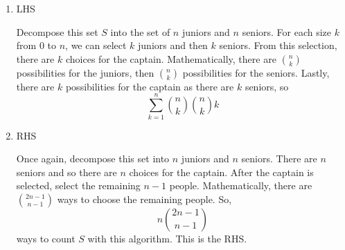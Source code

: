 \documentclass[12pt]{exam}
\begin{document}
\begin{enumerate}
\begin{enumerate}
    \item LHS
    
    Decompose this set $S$ into the set of $n$ juniors and $n$ seniors. For each size $k$ from $0$ to $n$, we can select $k$ juniors and then $k$ seniors. From this selection, there are $k$ choices for the captain. Mathematically, there are $\binom{n}{k}$ possibilities for the juniors, then $\binom{n}{k}$ possibilities for the seniors. Lastly, there are $k$ possibilities for the captain as there are $k$ seniors, so $$\sum_{k = 1}^{n} \binom{n}{k} \binom{n}{k} k$$
    
    \item RHS
    
    Once again, decompose this set into $n$ juniors and $n$ seniors. There are $n$ seniors and so there are $n$ choices for the captain. After the captain is selected, select the remaining $n - 1$ people. Mathematically, there are $\binom{2n - 1}{n - 1}$ ways to choose the remaining people. So, $$n \binom{2n - 1}{n - 1}$$ ways to count $S$ with this algorithm. This is the RHS. 
    
\end{enumerate}
\end{enumerate}
\end{document}
